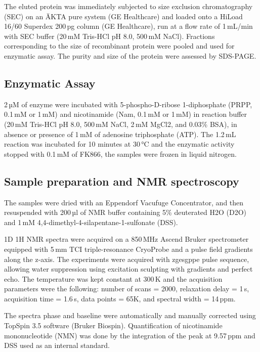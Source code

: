 The eluted protein was immediately subjected to size exclusion chromatography (SEC) on an ÄKTA pure system (GE Healthcare) and loaded onto a HiLoad 16/60 Superdex 200\,pg column (GE Healthcare), run at a flow rate of 1\,mL/min with SEC buffer (20\,mM Tris-HCl pH 8.0, 500\,mM NaCl). Fractions corresponding to the size of recombinant protein were pooled and used for enzymatic assay. The purity and size of the protein were assessed by SDS-PAGE.


\subsection{Enzymatic Assay}

2\,µM of enzyme were incubated with 5-phospho-D-ribose 1-diphosphate (PRPP, 0.1\,mM or 1\,mM) and nicotinamide (Nam, 0.1\,mM or 1\,mM) in reaction buffer (20\,mM Tris-HCl pH 8.0, 500\,mM NaCl, 2\,mM MgCl2, and 0.03\% BSA), in absence or presence of 1\,mM of adenosine triphosphate (ATP). The 1.2\,mL reaction was incubated for 10 minutes at 30\,°C and the enzymatic activity stopped with 0.1\,mM of FK866, the samples were frozen in liquid nitrogen.


\subsection{Sample preparation and NMR spectroscopy}

The samples were dried with an Eppendorf Vacufuge Concentrator, and then resuspended with 200\,µl of NMR buffer containing 5\% deuterated H2O (D2O) and 1\,mM 4,4-dimethyl-4-silapentane-1-sulfonate (DSS).

1D 1H NMR spectra were acquired on a 850\,MHz Ascend Bruker spectrometer equipped with 5\,mm TCI triple-resonance CryoProbe and a pulse field gradients along the z-axis. The experiments were acquired with zgesgppe pulse sequence, allowing water suppression using excitation sculpting with gradients and perfect echo. The temperature was kept constant at 300\,K and the acquisition parameters were the following: number of scans = 2000, relaxation delay = 1\,s, acquisition time = 1.6\,s, data points = 65K, and spectral width = 14\,ppm.

The spectra phase and baseline were automatically and manually corrected using TopSpin 3.5 software (Bruker Biospin). Quantification of nicotinamide mononucleotide (NMN) was done by the integration of the peak at 9.57\,ppm and DSS used as an internal standard.
